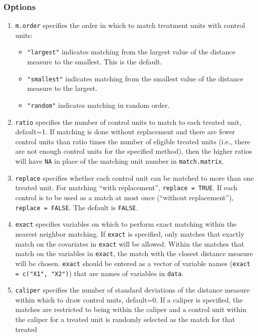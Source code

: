 \documentclass[oneside,letterpaper,titlepage]{article}
\begin{document}
\subsubsection{Options}
\begin{enumerate}
\item \texttt{m.order}  specifies the order in which to match
  treatment units with control units:
  \begin{itemize}
  \item {\tt "largest"} indicates matching from the largest value of
    the distance measure to the smallest. This is the default.
  \item {\tt "smallest"} indicates matching from the smallest value of
    the distance measure to the largest.
  \item {\tt "random"} indicates matching in random order.
  \end{itemize}
\item \texttt{ratio} specifies the number of control units to match to
  each treated unit, default=1.  If matching is done without
  replacement and there are fewer control units than ratio times the
  number of eligible treated units (i.e., there are not enough control 
  units for the specified method), then the higher ratios will have
  \texttt{NA} in place of the matching unit number in
  \texttt{match.matrix}.
\item \texttt{replace} specifies whether each control unit can be
  matched to more than one treated unit.  For matching ``with
  replacement'', \texttt{replace = TRUE}.  If each control is to be
  used as a match at most once (``without replacement''), \texttt{replace
    = FALSE}. The default is {\tt FALSE}.
\item \texttt{exact} specifies variables on which to perform exact
  matching within the nearest neighbor matching.  If \texttt{exact} is
  specified, only matches that exactly match on the covariates in
  \texttt{exact} will be allowed.  Within the matches that match on
  the variables in \texttt{exact}, the match with the closest distance
  measure will be chosen.  \texttt{exact} should be entered as a
  vector of variable names (\texttt{exact = c("X1", "X2")}) that are
  names of variables in \texttt{data}.
\item \texttt{caliper} specifies the number of standard deviations of
  the distance measure within which to draw control units, default=0.
  If a caliper is specified, the matches are restricted to being
  within the caliper and a control unit within the caliper for a
  treated unit is randomly selected as the match for that treated

\end{enumerate}
\end{document}
